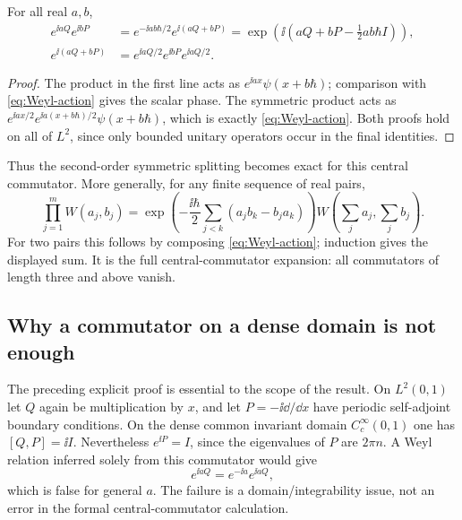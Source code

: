 \begin{theorem}\label{thm:weyl}
For all real $a,b$,
\begin{align}
 e^{\ii aQ}e^{\ii bP}
 &=e^{-\ii ab\hbar/2}e^{\ii(aQ+bP)}
  =\exp\left(\ii\left(aQ+bP-\tfrac12ab\hbar I\right)\right),
 \label{eq:canonical-BCH}\\
 e^{\ii(aQ+bP)}
 &=e^{\ii aQ/2}e^{\ii bP}e^{\ii aQ/2}.
 \label{eq:canonical-symmetric}
\end{align}
\end{theorem}
\begin{proof}
The product in the first line acts as $e^{\ii ax}\psi(x+b\hbar)$; comparison with \cref{eq:Weyl-action} gives the scalar phase. The symmetric product acts as
$e^{\ii ax/2}e^{\ii a(x+b\hbar)/2}\psi(x+b\hbar)$,
which is exactly \cref{eq:Weyl-action}. Both proofs hold on all of $L^2$, since only bounded unitary operators occur in the final identities.
\end{proof}
Thus the second-order symmetric splitting becomes exact for this central commutator. More generally, for any finite sequence of real pairs,
\begin{equation}\label{eq:Weyl-many}
 \prod_{j=1}^m W(a_j,b_j)
 =\exp\left(-\frac{\ii\hbar}{2}
    \sum_{j<k}(a_jb_k-b_ja_k)\right)
 W\left(\sum_j a_j,\sum_j b_j\right).
\end{equation}
For two pairs this follows by composing \cref{eq:Weyl-action}; induction gives the displayed sum. It is the full central-commutator expansion: all commutators of length three and above vanish.

\subsection{Why a commutator on a dense domain is not enough}
The preceding explicit proof is essential to the scope of the result. On $L^2(0,1)$ let $Q$ again be multiplication by $x$, and let $P=-\ii\dd/\dd x$ have periodic self-adjoint boundary conditions. On the dense common invariant domain $C_c^\infty(0,1)$ one has $[Q,P]=\ii I$. Nevertheless $e^{\ii P}=I$, since the eigenvalues of $P$ are $2\pi n$. A Weyl relation inferred solely from this commutator would give
\begin{equation}
 e^{\ii aQ}=e^{-\ii a}e^{\ii aQ},
\end{equation}
which is false for general $a$. The failure is a domain/integrability issue, not an error in the formal central-commutator calculation.

